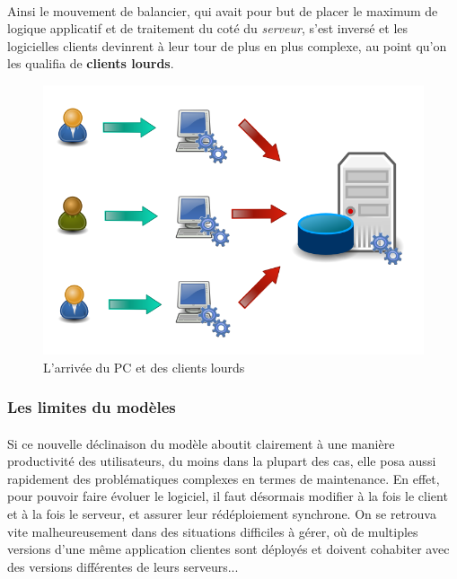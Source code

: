 {  \paragraph{} Ainsi le mouvement de balancier, qui avait pour but de placer le maximum de logique
  applicatif et de traitement du coté du \textit{serveur}, s'est inversé et les logicielles clients
  devinrent à leur tour de plus en plus complexe, au point qu'on les qualifia de \textbf{clients
  lourds}.

  \begin{figure}[h]
    \begin{center}
      \includegraphics[scale=0.3]{img/fat-clients.png}
      \caption{L'arrivée du PC et des clients lourds}
      \label{fat-clients}
    \end{center}
  \end{figure}

  \subsubsection{Les limites du modèles}

  \paragraph{} Si ce nouvelle déclinaison du modèle aboutit clairement à une manière productivité
  des utilisateurs, du moins dans la plupart des cas, elle posa aussi rapidement des problématiques
  complexes en termes de maintenance. En effet, pour pouvoir faire évoluer le logiciel, il faut
  désormais modifier à la fois le client et à la fois le serveur, et assurer leur rédéploiement
  synchrone. On se retrouva vite malheureusement dans des situations difficiles à gérer, où de
  multiples versions d'une même application clientes sont déployés et doivent cohabiter avec des
  versions différentes de leurs serveurs...
}

